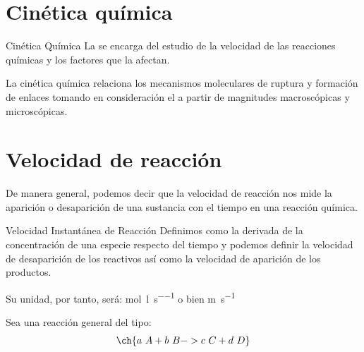     \section{Cinética química}\label{sec:cinetica-quimica}

    \begin{center}
        \begin{definicion}[width=0.9\textwidth]{Cinética Química}
            La  se encarga del estudio de la velocidad de las reacciones químicas y los factores que la afectan.
        \end{definicion}
    \end{center}

    La cinética química relaciona los mecanismos moleculares de ruptura y formación de enlaces tomando en consideración el  a partir de magnitudes macroscópicas y microscópicas.

    \section{Velocidad de reacción}\label{sec:velocidad-de-reaccion}

    De manera general, podemos decir que la velocidad de reacción nos mide la aparición o desaparición de una sustancia con el tiempo en una reacción química.

    \begin{center}
        \begin{definicion}[width=0.9\textwidth]{Velocidad Instantánea de Reacción}
            Definimos  como la derivada de la concentración de una especie respecto del tiempo y podemos definir la velocidad de desaparición de los reactivos así como la velocidad de aparición de los productos.

            Su unidad, por tanto, será: \unit{\mole\per\litre\per\s} o bien \unit{\m\per\s}
        \end{definicion}
    \end{center}


    Sea una reacción general del tipo:
    \begin{equation}
        \ch{a\ A + b\ B -> c\ C + d\ D} \label{eq:general}
    \end{equation}


